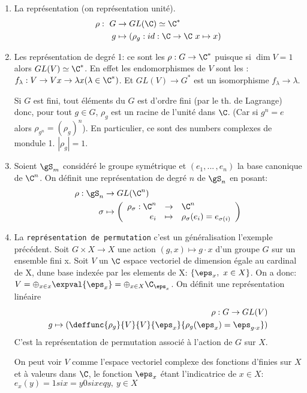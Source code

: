 \begin{exercise}
	\begin{enumerate}
	\leavevmode
		\item La représentation  (on représentation unité).
		\begin{align*}
			\rho:\ G &\rightarrow GL(\C)\simeq\C^\ast\\
			g &\mapsto (\rho_g: id:\C\rightarrow \C\ x\mapsto x)
		\end{align*}
		\item Les représentation de degré 1: ce sont les  $\rho:G\rightarrow \C^\ast$ puisque si $\dim V= 1$ alors $GL(V)\simeq\C^\ast$.
		En effet les endomorphismes de $V$ sont les : $f_\lambda: V\rightarrow V x\rightarrow \lambda x(\lambda\in \C^\ast)$. Et $GL(V)\rightarrow  G^\ast$ est un isomorphisme $f_\lambda\rightarrow \lambda$.
		
		Si $G$ est fini, tout éléments du $G$ est d'ordre fini (par le th. de Lagrange) donc, pour tout $g \in G$, $\rho_g$ est un racine de l'unité dans $\C$.
		(Car si $g^n=e$ alors $\rho_{g^n}=(\rho_g)^n$). En particulier, ce sont des numbers complexes de mondule 1. $|\rho_g|=1$.
		\item Soient $\gS_m$ considéré le groupe symétrique et $(e_1,...\,, e_n)$ la base canonique de $\C^n$. On définit une représentation de degré $n$ de $\gS_n$ en posant:
		\begin{align*}
			\rho:\gS_n &\rightarrow GL(\C^n) \\
			\sigma &\mapsto \left(
				\begin{array}{rcl} \rho_\sigma: \C^n &\rightarrow&  \C^n \\ e_i &\mapsto& \rho_\sigma(e_i)=e_{\sigma(i)} \end{array}
			\right)
		\end{align*}
		\item La \texttt{représentation de permutation} c'est un généralisation l'exemple précédent. Soit $G\times X\rightarrow X$ une action $(g,x)\mapsto g\cdot x$ d'un groupe $G$ sur un ensemble fini x. Soit $V$ un $\C$ espace vectoriel de dimension égale au cardinal de X, dune base indexée par les elements de X: $\{\eps_x,\ x\in X\}$. On a donc: $V=\oplus_{x\in x}\expval{\eps_x}=\oplus_{x\in X}\C_{\eps_x}$. On définit une représentation linéaire
		\begin{align*}
		\rho: G\rightarrow  GL(V)\\
		g\mapsto(\deffunc{\rho_g}{V}{V}{\eps_x}{\rho_g(\eps_x)=\eps_{g\cdot x}})
		\end{align*}
		C'est la représentation de permutation associé à l'action de $G$ sur $X$.
		\begin{remark}
			On peut voir $V$ comme l'espace vectoriel complexe des fonctions d'finies sur $X$ et à valeurs dans $\C$, le fonction $\eps_x$ étant l'indicatrice de $x\in X$: $e_x(y)=1 si x=y 0 si x eq y,\ y\in X$
		\end{remark}
		

\end{enumerate}
\end{exercise}
